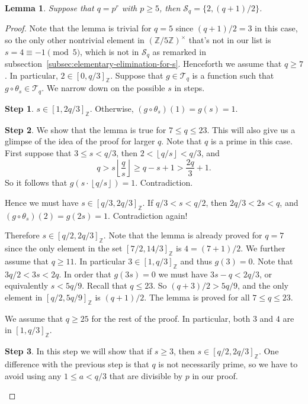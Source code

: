 \documentclass{amsart}[11pt]
\newtheorem{lem}[thm]{Lemma}
\theoremstyle{definition}
\newtheorem{step}{Step}
\numberwithin{equation}{section}
\theoremstyle{notitle}
\begin{document}
\begin{lem}\label{lem:possible_choices_of_s}
Suppose that $q=p^r$ with $p\geq 5$, then ${\mathscr{S}}_q=\{2, (q+1)/2\}$. 
\end{lem}
\begin{proof}
  Note that the lemma is trivial for $q=5$ since $(q+1)/2=3$ in this
  case, so the only other nontrivial element in $({\mathbb{Z}}/5{\mathbb{Z}})^\times $
  that's not in our list is $s=4 \equiv -1 \pmod{5}$, which is not in
  ${\mathscr{S}}_q$ as remarked in
  subsection~\ref{subsec:elementary-elimination-for-s}.  Henceforth we
  assume that $q\geq 7$. In particular, $2\in [0, q/3]_{\mathbb{Z}}$. Suppose
  that $g\in {\mathscr{T}}_q$ is a function such that $g\circ \theta_s\in
  {\mathscr{T}}_q$. We narrow down on the possible $s$ in steps.
  \begin{step}
$s\in [1, 2q/3]_{\mathbb{Z}}$.  Otherwise, $(g\circ \theta_s)(1)=g(s)=1$. 
  \end{step}
  \begin{step}
    We show that the lemma is true for $7\leq q\leq 23$. This will
    also give us a glimpse of the idea of the proof for larger
    $q$. Note that $q$ is a prime in this case.  First suppose that
    $3\leq s <q/3$, then $2<{\left\lfloor {q/s} \right\rfloor}<q/3$, and
    \[ q> s{\left\lfloor {\frac{q}{s}} \right\rfloor} \geq q-s+1> \frac{2q}{3}+1.\] So it
    follows that $g(s\cdot {\left\lfloor {q/s} \right\rfloor})=1$. Contradiction.

    Hence we must have $s\in [q/3, 2q/3]_{\mathbb{Z}}$. If $q/3< s< q/2$, then
    $ 2q/3< 2s <q$, and $(g\circ\theta_s)(2)=g(2s)=1$. Contradiction
    again!

Therefore $s\in [q/2, 2q/3]_{\mathbb{Z}}$. Note that the lemma is already
proved for $q=7$ since the only element in the set $[7/2, 14/3]_{\mathbb{Z}}$
is $4=(7+1)/2$. We further assume that $q\geq 11$. In particular $3\in
[1, q/3]_{\mathbb{Z}}$ and thus $g(3)=0$. Note that $3q/2 < 3s < 2q$. In order
that $g(3s)=0$ we must have $3s-q< 2q/3$, or equivalently $s <
5q/9$. Recall that $q\leq 23$. So $(q+3)/2 > 5q/9$, and the only
element in $[q/2, 5q/9]_{\mathbb{Z}}$ is $(q+1)/2$. The lemma is proved for
all $7\leq q \leq 23$. 
  \end{step}
  We assume that $q\geq 25$ for the rest of the proof. In particular,
  both $3$ and $4$ are in $[1, q/3]_{\mathbb{Z}}$.
  \begin{step}
    In this step we will show that if $s\geq 3$, then $s\in [q/2,
    2q/3]_{\mathbb{Z}}$. One difference with the previous step is that $q$ is
    not necessarily prime, so we have to avoid using any $1\leq a<
    q/3$ that are divisible by $p$ in our proof. 


\end{step}
\end{proof}
\end{document}
